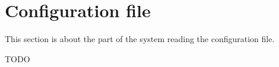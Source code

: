 \section{Configuration file}

This section is about the part of the system reading the configuration file.

TODO